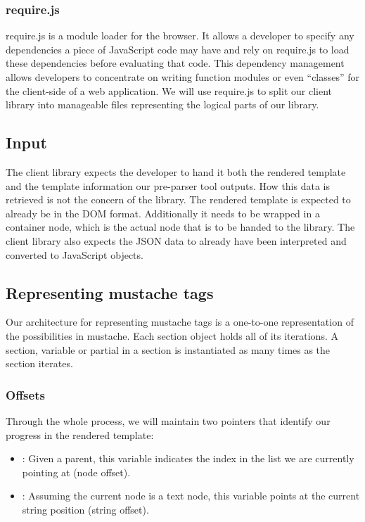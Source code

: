 \documentclass[thesis.tex]{subfiles}
\begin{document}
\subsubsection{require.js}
\label{sec:requirejs}
require.js is a module loader for the browser. It allows a developer to specify
any dependencies a piece of JavaScript code may have and rely on require.js to
load these dependencies before evaluating that code. This dependency management
allows developers to concentrate on writing function modules or even ``classes''
for the client-side of a web application. We will use require.js to split our
client library into manageable files representing the logical parts of our
library.

\subsection{Input}
The client library expects the developer to hand it both the rendered template
and the template information our pre-parser tool outputs.
How this data is retrieved is not the concern of the library.
The rendered template is expected to already be in the DOM format.
Additionally it needs to be wrapped in a container node,
which is the actual node that is to be handed to the library.
The client library also expects the JSON data to already have been interpreted
and converted to JavaScript objects.

\subsection{Representing mustache tags}
Our architecture for representing mustache tags is a one-to-one representation
of the possibilities in mustache.
Each section object holds all of its iterations. A section, variable or partial
in a section is instantiated as many times as the section iterates.

\subsubsection{Offsets}
Through the whole process, we will maintain two pointers that identify our
progress in the rendered template:
\begin{itemize}
\item {}: Given a parent, this variable indicates the index
      in the  list we are currently pointing at (node offset).
\item {}: Assuming the current node is a text node, this variable
      points at the current string position (string offset).
\end{itemize}
\end{document}
